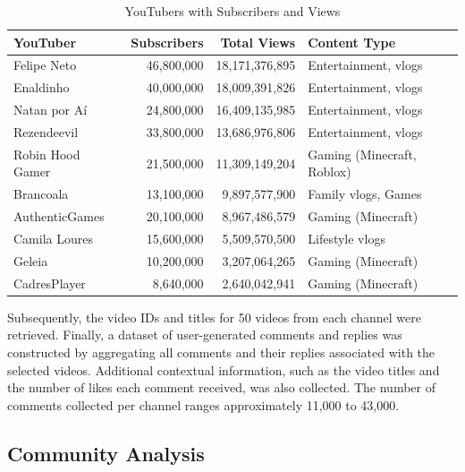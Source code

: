 \documentclass[12pt]{article}
\begin{document}
\begin{table}[h!]
\centering
\caption{YouTubers with Subscribers and Views}
\label{tab:youtubers}
\begin{tabular}{|l|r|r|l|}
\hline
\textbf{YouTuber}        & \textbf{Subscribers}    & \textbf{Total Views}       & \textbf{Content Type }      \\ \hline
Felipe Neto              & 46,800,000             & 18,171,376,895        & Entertainment, vlogs        \\ \hline
Enaldinho                & 40,000,000             & 18,009,391,826        & Entertainment, vlogs        \\ \hline
Natan por Aí             & 24,800,000             & 16,409,135,985        & Entertainment, vlogs        \\ \hline
Rezendeevil              & 33,800,000             & 13,686,976,806        & Entertainment, vlogs        \\ \hline
Robin Hood Gamer         & 21,500,000             & 11,309,149,204        & Gaming (Minecraft, Roblox)  \\ \hline
Brancoala                & 13,100,000             & 9,897,577,900         & Family vlogs, Games         \\ \hline
AuthenticGames           & 20,100,000             & 8,967,486,579         & Gaming (Minecraft)          \\ \hline
Camila Loures            & 15,600,000             & 5,509,570,500         & Lifestyle vlogs             \\ \hline
Geleia                   & 10,200,000             & 3,207,064,265         & Gaming (Minecraft)          \\ \hline
CadresPlayer             & 8,640,000              & 2,640,042,941         & Gaming (Minecraft)          \\ \hline
\end{tabular}
\end{table}

Subsequently, the video IDs and titles for 50 videos from each channel were retrieved. 
Finally, a dataset of user-generated comments and replies was constructed by aggregating all comments 
and their replies associated with the selected videos. Additional contextual information, such as 
the video titles and the number of likes each comment received, was also collected. 
The number of comments collected per channel ranges approximately 11,000 to 43,000.


\subsection{Community Analysis}
\end{document}
